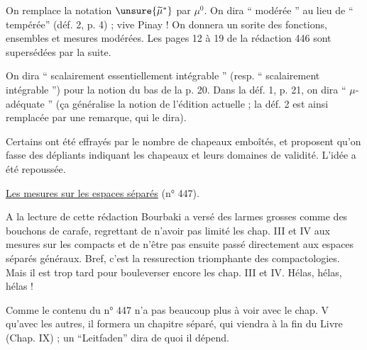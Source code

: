 On remplace la notation $\unsure{\widetilde\mu^*}$ par $\mu^0$. On dira `` modérée '' au lieu de `` tempérée'' (déf. 2, p. 4) ; vive Pinay ! On donnera un sorite des fonctions, ensembles et mesures modérées. Les pages 12 à 19 de la rédaction 446 sont supersédées par la suite.

On dira `` scalairement essentiellement intégrable '' (resp. `` scalairement intégrable '') pour la notion du bas de la p. 20. Dans la déf. 1, p. 21, on dira `` $\mu$-adéquate '' (ça généralise la notion de l'édition actuelle ; la déf. 2 est ainsi remplacée par une remarque, qui le dira).

Certains ont été effrayés par le nombre de chapeaux emboîtés, et proposent qu'on fasse des dépliants indiquant les chapeaux et leurs domaines de validité. L'idée a été repoussée.

\uline{Les mesures sur les espaces séparés} (n° 447).

A la lecture de cette rédaction Bourbaki a versé des larmes grosses comme des bouchons de carafe, regrettant de n'avoir pas limité les chap. III et IV aux mesures sur les compacts et de n'être pas ensuite passé directement aux espaces séparés généraux. Bref, c'est la ressurection triomphante des compactologies. Mais il est trop tard pour bouleverser encore les chap. III et IV. Hélas, hélas, hélas !

Comme le contenu du n° 447 n'a pas beaucoup plus à voir avec le chap. V qu'avec les autres, il formera un chapitre séparé, qui viendra à la fin du Livre (Chap. IX) ; un ``Leitfaden'' dira de quoi il dépend.

